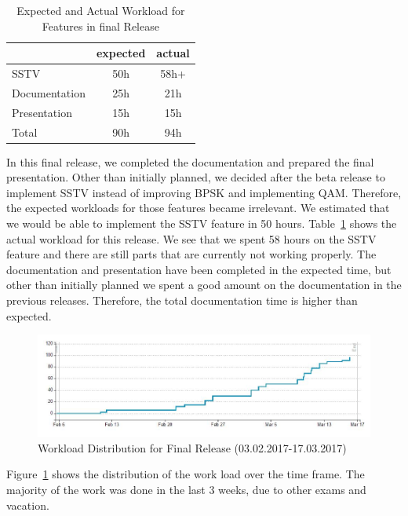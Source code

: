 \begin{table}[!htbp]
	\centering
	\caption{Expected and Actual Workload for Features in final Release}
	\label{tab:final:features}
	\begin{tabular}{ l | c | c }
		& expected  & actual \\ \hline
		SSTV & 50h & 58h+ \\  \hline
		Documentation & 25h & 21h \\ \hline \hline
		Presentation & 15h & 15h \\ \hline \hline 
		Total & 90h & 94h  
	\end{tabular}
\end{table}


In this final release, we completed the documentation and prepared the final presentation. Other than initially planned, we decided after the beta release to implement \ac{SSTV} instead of improving \ac{BPSK} and implementing \ac{QAM}. Therefore, the expected workloads for those features became irrelevant. We estimated that we would be able to implement the SSTV feature in 50 hours. Table~\ref{tab:final:features} shows the actual workload for this release. We see that we spent 58 hours on the SSTV feature and there are still parts that are currently not working properly. The documentation and presentation have been completed in the expected time, but other than initially planned we spent a good amount on the documentation in the previous releases. Therefore, the total documentation time is higher than expected. 

\begin{figure}[!htbp]
	\centering
	\includegraphics[width=1\linewidth]{gfx/Agilefant_Final.jpg}
	\caption{Workload Distribution for Final Release (03.02.2017-17.03.2017)}
	\label{fig:agilefant_final}
\end{figure}

Figure~\ref{fig:agilefant_final} shows the distribution of the work load over the time frame. The majority of the work was done in the last 3 weeks, due to other exams and vacation. 
